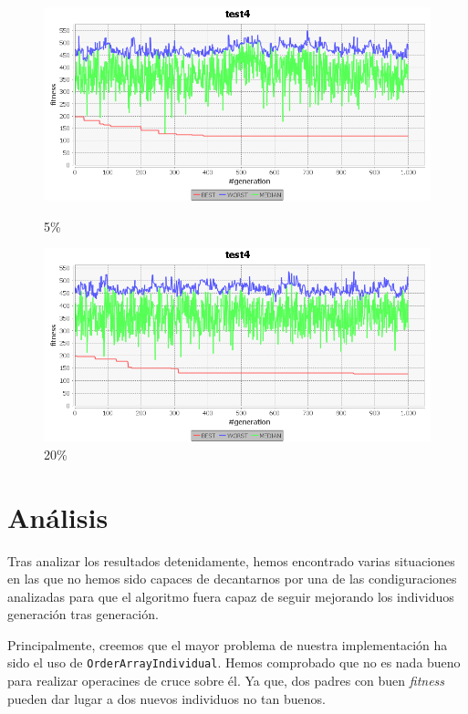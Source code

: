 \documentclass[a4paper,12pt,titlepage]{article}
\begin{document}
\begin{figure}[!ht]
\centering
\begin{minipage}{.5\textwidth}
  \centering
  \includegraphics[width=\textwidth]{5mut.png}
  \caption{5\%}
\end{minipage}%
\begin{minipage}{.5\textwidth}
  \centering
  \includegraphics[width=\textwidth]{20mut.png}
  \caption{20\%}
\end{minipage}
\end{figure}

\section{Análisis}

Tras analizar los resultados detenidamente, hemos encontrado varias situaciones en las que no hemos sido capaces de decantarnos por una de las condiguraciones analizadas para que el algoritmo fuera capaz de seguir mejorando los individuos generación tras generación.

Principalmente, creemos que el mayor problema de nuestra implementación ha sido el uso de \lstinline|OrderArrayIndividual|. Hemos comprobado que no es nada bueno para realizar operacines de cruce sobre él. Ya que, dos padres con buen \textit{fitness} pueden dar lugar a dos nuevos individuos no tan buenos.
\end{document}
